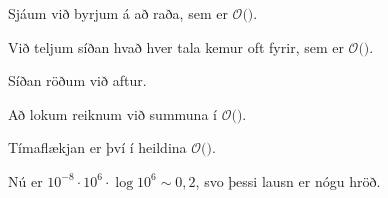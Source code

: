 {
}

{
}

{
	{
		\item<1-> Sjáum við byrjum á að raða, sem er $\mathcal{O}($\onslide<2->{$n \log n$}$)$.
		\item<3-> Við teljum síðan hvað hver tala kemur oft fyrir, sem er $\mathcal{O}($\onslide<4->{$\,n\,$}$)$.
		\item<5-> Síðan röðum við aftur.
		\item<6-> Að lokum reiknum við summuna í $\mathcal{O}($\onslide<7->{$\,n\,$}$)$.
		\item<8-> Tímaflækjan er því í heildina $\mathcal{O}($\onslide<9->{$n \log n$}$)$.
		\item<10-> Nú er $10^{-8} \cdot 10^6 \cdot \log 10^6 \sim 0,2$, svo þessi lausn er nógu hröð.
	}
}

{
}


